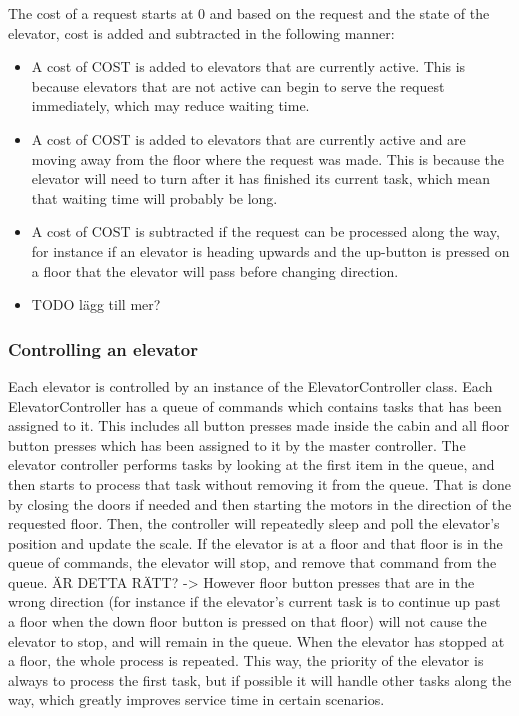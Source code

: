 \documentclass[a4paper]{article}
\begin{document}
The cost of a request starts at 0 and based on the request and the state of the elevator, cost is added and subtracted in the following manner:
\begin{itemize}
\item A cost of COST is added to elevators that are currently active. This is because elevators that are not active can begin to serve the request immediately, which may reduce waiting time.
\item A cost of COST is added to elevators that are currently active and are moving away from the floor where the request was made. This is because the elevator will need to turn after it has finished its current task, which mean that waiting time will probably be long.
\item A cost of COST is subtracted if the request can be processed along the way, for instance if an elevator is heading upwards and the  up-button is pressed on a floor that the elevator will pass before changing direction.
\item TODO lägg till mer?
\end{itemize} 

\subsubsection{Controlling an elevator}

Each elevator is controlled by an instance of the ElevatorController class. Each ElevatorController has a queue of commands which contains tasks that has been assigned to it. This includes all button presses made inside the cabin and all floor button presses which has been assigned to it by the master controller. The elevator controller performs tasks by looking at the first item in the queue, and then starts to process that task without removing it from the queue. That is done by closing the doors if needed and then starting the motors in the direction of the requested floor. Then, the controller will repeatedly sleep and poll the elevator's position and update the scale. If the elevator is at a floor and that floor is in the queue of commands, the elevator will stop, and remove that command from the queue. ÄR DETTA RÄTT? -> However floor button presses that are in the wrong direction (for instance if the elevator's current task is to continue up past a floor when the down floor button is pressed on that floor) will not cause the elevator to stop, and will remain in the queue. When the elevator has stopped at a floor, the whole process is repeated. This way, the priority of the elevator is always to process the first task, but if possible it will handle other tasks along the way, which greatly improves service time in certain scenarios.
\end{document}
